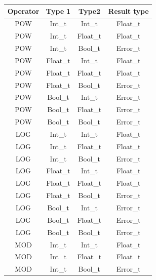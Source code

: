 \begin{figure}[H]
    \centering
    \begin{tabular}{cccc}
        \toprule
        \textbf{Operator} & \textbf{Type 1} & \textbf{Type2} & \textbf{Result type}\\
        \midrule POW & Int\_t & Int\_t      & Float\_t \\
        \midrule POW & Int\_t & Float\_t    & Float\_t \\
        \midrule POW & Int\_t & Bool\_t     & Error\_t \\

        \midrule POW & Float\_t & Int\_t    & Float\_t \\
        \midrule POW & Float\_t & Float\_t  & Float\_t \\
        \midrule POW & Float\_t & Bool\_t   & Error\_t \\

        \midrule POW & Bool\_t & Int\_t     & Error\_t \\
        \midrule POW & Bool\_t & Float\_t   & Error\_t \\
        \midrule POW & Bool\_t & Bool\_t    & Error\_t \\

        \midrule LOG & Int\_t & Int\_t      & Float\_t \\
        \midrule LOG & Int\_t & Float\_t    & Float\_t \\
        \midrule LOG & Int\_t & Bool\_t     & Error\_t \\

        \midrule LOG & Float\_t & Int\_t    & Float\_t \\
        \midrule LOG & Float\_t & Float\_t  & Float\_t \\
        \midrule LOG & Float\_t & Bool\_t   & Error\_t \\

        \midrule LOG & Bool\_t & Int\_t     & Error\_t \\
        \midrule LOG & Bool\_t & Float\_t   & Error\_t \\
        \midrule LOG & Bool\_t & Bool\_t    & Error\_t \\

        \midrule MOD & Int\_t & Int\_t      & Float\_t \\
        \midrule MOD & Int\_t & Float\_t    & Float\_t \\
        \midrule MOD & Int\_t & Bool\_t     & Error\_t \\


\end{tabular}
\end{figure}
